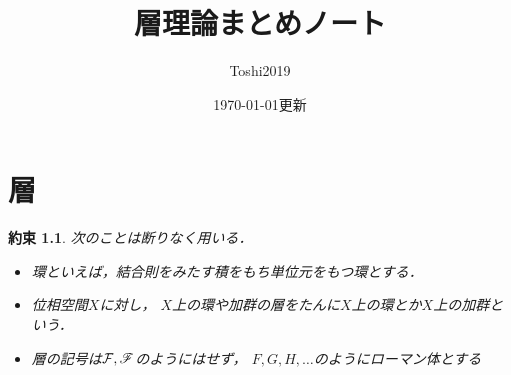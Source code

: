\theoremstyle{mystyle}
\newtheorem{AXM}{公理}[section]
\newtheorem{DFN}[Axiom]{定義}
\newtheorem{THM}[Axiom]{定理}
\newtheorem*{THM*}{定理}
\newtheorem{PRP}[Axiom]{命題}
\newtheorem{LMM}[Axiom]{補題}
\newtheorem{CRL}[Axiom]{系}
\newtheorem{EG}[Axiom]{例}
\newtheorem{CNV}[Axiom]{約束}





\def\inner<#1>{\langle #1 \rangle}

\def\ind<#1>{\mathop{\text{``}\hspace{-0.7pt}#1\limits\hspace{-1.5pt}\text{''}}}







\title{層理論まとめノート}
\author{Toshi2019}
\date{\today 更新}

\maketitle
\frontmatter
\tableofcontents
\layout
\mainmatter
\chapter{層}



\begin{CNV}次のことは断りなく用いる．
    \begin{itemize}
        \item 環といえば，結合則をみたす積をもち単位元をもつ環とする．
        \item 位相空間$X$に対し，
        $X$上の環や加群の層をたんに$X$上の環とか$X$上の加群という．
        \item 層の記号は$\mathcal{F},\mathscr{F}$のようにはせず，
        $F,G,H,\ldots$のようにローマン体とする
    \end{itemize}
\end{CNV}

